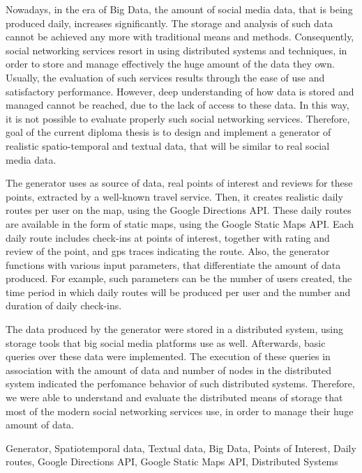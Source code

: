 
\begin{abstracten}%

Nowadays, in the era of Big Data, the amount of social media data, that is being produced daily, increases significantly. The storage and analysis of such data cannot 
be achieved any more with traditional means and methods. Consequently, social networking services resort in using distributed systems and techniques, in order to store 
and manage effectively the huge amount of the data they own. Usually, the evaluation of such services results through the ease of use and satisfactory performance. 
However, deep understanding of how data is stored and managed cannot be reached, due to the lack of access to these data. In this way, it is not possible to 
evaluate properly such social networking services. Therefore, goal of the current diploma thesis is to design and implement a generator of realistic spatio-temporal and 
textual data, that will be similar to real social media data. 

The generator uses as source of data, real points of interest and reviews for these points, extracted by a well-known travel service. Then, it creates 
realistic daily routes per user on the map, using the Google Directions API. These daily routes are available in the form of static maps, using the 
Google Static Maps API. Each daily route includes check-ins at points of interest, together with rating and review of the point, and gps traces 
indicating the route. Also, the generator functions with various input parameters, that differentiate the amount of data produced. For example, such parameters 
can be the number of users created, the time period in which daily routes will be produced per user and the number and duration of daily check-ins. 

The data produced by the generator were stored in a distributed system, using storage tools that big social media platforms use as well. Afterwards, 
basic queries over these data were implemented. The execution of these queries in association with the 
amount of data and number of nodes in the distributed system indicated the perfomance behavior of such distributed systems. Therefore, we were able to 
understand and evaluate the distributed means of storage that most of the modern social networking services use, in order to manage their huge amount of data. 



 \begin{keywordsen}
  Generator, Spatiotemporal data, Textual data, Big Data, Points of Interest, Daily routes, Google Directions API, Google Static Maps API, Distributed Systems
 \end{keywordsen}
\end{abstracten}
